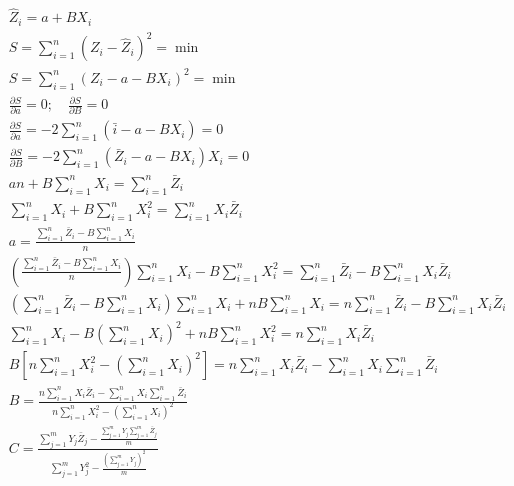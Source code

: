 \begin{align*}
    &\hat{Z}_i = a + BX_i\\
    &S =\sum_{i = 1}^n\left(Z_i - \hat{Z}_i \right)^2 = \min\\
    &S =\sum_{i = 1}^n\left(Z_i - a - BX_i \right)^2 = \min\\
    &\frac{\partial S}{\partial a} = 0;\quad \frac{\partial S}{\partial B} = 0\\
    & \frac{\partial S}{\partial a} = - 2\sum_{i = 1}^n \left(\bar{i} - a - BX_i \right) = 0\\
    &\frac{\partial S}{\partial B} = - 2\sum_{i = 1}^{n}\left(\bar{Z}_i - a - BX_i \right)X_i = 0\\
    & an + B \sum_{i = 1}^{n} X_i = \sum_{i = 1}^{n} \bar{Z}_i\\
    & \sum_{i = 1}^{n} X_i + B \sum_{i = 1}^{n} X_i^2 = \sum_{i = 1}^{n}X_i \bar{Z}_i\\
    & a = \frac{\sum_{i= 1}^{n}\bar{Z}_i - B\sum_{i = 1}^{n} X_i}{n}\\
    & \left(\frac{\sum_{i= 1}^{n}\bar{Z}_i - B\sum_{i = 1}^{n} X_i}{n}\right) \sum_{i= 1}^{n}X_i - B\sum_{i = 1}^{n} X_i^2 = \sum_{i= 1}^{n}\bar{Z}_i - B\sum_{i = 1}^{n} X_i \bar{Z}_i\\
    &\left(\sum_{i= 1}^{n}\bar{Z}_i - B\sum_{i = 1}^{n} X_i\right)\sum_{i= 1}^{n}X_i + nB\sum_{i = 1}^{n} X_i = n\sum_{i= 1}^{n}\bar{Z}_i - B\sum_{i = 1}^{n} X_i \bar{Z}_i\\
    &\sum_{i= 1}^{n}X_i - B\left(\sum_{i = 1}^{n} X_i\right)^2 + nB\sum_{i = 1}^{n} X_i^2 = n\sum_{i = 1}^{n} X_i \bar{Z}_i\\
    &B\left[n\sum_{i = 1}^{n} X_i^2 - \left(\sum_{i = 1}^{n} X_i\right)^2 \right] = n \sum_{i = 1}^{n} X_i \bar{Z}_i -\sum_{i = 1}^{n} X_i\sum_{i = 1}^{n} \bar{Z}_i\\
    &B = \frac{n\sum_{i = 1}^{n} X_i \bar{Z}_i - \sum_{i = 1}^{n} X_i\sum_{i = 1}^{n} \bar{Z}_i }{n\sum_{i = 1}^{n} X_i^2 - \left(\sum_{i = 1}^{n} X_i\right)^2 }\\
    &C = \frac{\sum_{j = 1}^{m} Y_j \bar{Z}_j - \frac{\sum_{j = 1}^{m}Y_j \sum_{j = 1}^{m}\bar{Z}_j}{m} }{\sum_{j = 1}^{m} Y_j^2 - \frac{\left(\sum_{j = 1}^{m} Y_j\right)^2}{m} }
\end{align*}

